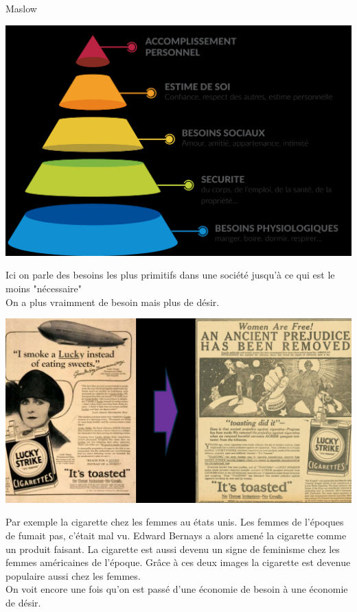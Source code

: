 \begin{parag}{Maslow}
	\begin{center}
    \includegraphics[scale=0.15]{92025-09-23.png}
	\end{center}
	
    Ici on parle des besoins les plus primitifs dans une société jusqu'à ce qui est le moins "nécessaire"\\
    On a plus vraimment de besoin mais plus de désir.\\
    \begin{center}
    \includegraphics[scale=0.2]{102025-09-23.png}
    \end{center}
    
    Par exemple la cigarette chez les femmes au états unis. Les femmes de l'époques de fumait pas, c'était mal vu. Edward Bernays a alors amené la cigarette comme un produit faisant. La cigarette est aussi devenu un signe de feminisme chez les femmes américaines de l'époque. Grâce à ces deux images la cigarette est devenue populaire aussi chez les femmes.\\
    On voit encore une fois qu'on est passé d'une économie de besoin à une économie de désir.
\end{parag}


